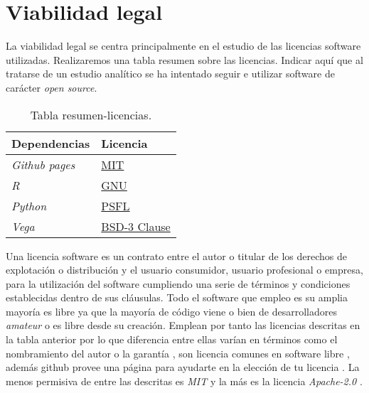 

\section{Viabilidad legal}\label{estudio-viabilidad}

La viabilidad legal se centra principalmente en el estudio de las licencias software utilizadas. Realizaremos una tabla resumen sobre las licencias. Indicar aquí que al tratarse de un estudio analítico se ha intentado seguir e utilizar software de carácter \textit{open source}.

\begin{table}[H]
	\begin{center}
		\begin{tabular}{|l|l|}
			\hline
			Dependencias & Licencia \\
			\hline \hline
			\emph{Github pages} & \href{https://opensource.org/licenses/MIT}{MIT}\\ \hline
			\emph{R} & \href{https://en.wikipedia.org/wiki/GNU_General_Public_License#Version_2}{GNU}\\ \hline
			\emph{Python} & \href{https://es.wikipedia.org/wiki/Python_Software_Foundation_License}{PSFL}\\ \hline
			\emph{Vega} & \href{https://github.com/vega/vega/blob/master/LICENSET}{BSD-3 Clause}\\ \hline
			
		\end{tabular}
		\caption{Tabla resumen-licencias.}
		\label{tabla:licencias}
	\end{center}
\end{table}



Una licencia software es un contrato entre el autor o titular de los derechos de explotación o distribución y el usuario consumidor, usuario profesional o empresa, para la utilización del software cumpliendo una serie de términos y condiciones establecidas dentro de sus cláusulas. Todo el software que empleo es su amplia mayoría es libre ya que la mayoría de código viene o bien de desarrolladores \emph{amateur} o es libre desde su creación. Emplean por tanto las licencias descritas en la tabla anterior por lo que diferencia entre ellas varían en términos como el nombramiento del autor o la garantía , son licencia comunes en software libre \cite{githublicense} , además github provee una página para ayudarte en la elección de tu licencia \citep{githubchoose}. La menos permisiva de entre las descritas es \emph{MIT} \citep{mit}  y la más es la licencia \emph{Apache-2.0} \cite{apache}.

